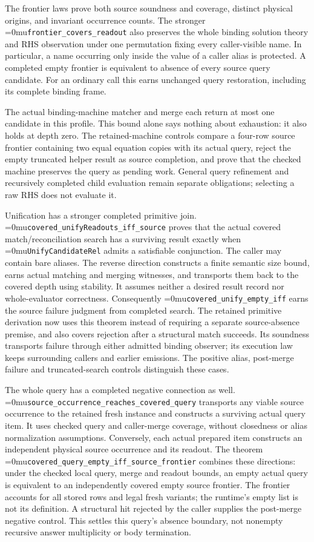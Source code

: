 \documentclass[11pt,a4paper]{article}
\newcommand{\name}[1]{\textup{\Urlmuskip=0mu\relax\nolinkurl{#1}}}
\begin{document}
The frontier laws prove both source soundness and coverage, distinct
physical origins, and invariant occurrence counts. The stronger
\name{frontier_covers_readout} also preserves the whole binding solution
theory and RHS observation under one permutation fixing every caller-visible
name. In particular, a name occurring only inside the value of a caller
alias is protected. A completed empty frontier is equivalent to absence of
every source query candidate. For an ordinary call this earns unchanged
query restoration, including its complete binding frame.

The actual binding-machine matcher and merge each return at most one
candidate in this profile. This bound alone says nothing about exhaustion:
it also holds at depth zero. The retained-machine controls compare a
four-row source frontier containing two equal equation copies with its
actual query, reject the empty truncated helper result as source completion,
and prove that the checked machine preserves the query as pending work.
General query refinement and recursively completed child evaluation remain
separate obligations; selecting a raw RHS does not evaluate it.

Unification has a stronger completed primitive join.
\name{covered_unifyReadouts_iff_source} proves that the actual covered
match/reconciliation search has a surviving result exactly when
\name{UnifyCandidateRel} admits a satisfiable conjunction. The caller may
contain bare aliases. The reverse direction constructs a finite semantic
size bound, earns actual matching and merging witnesses, and transports
them back to the covered depth using stability. It assumes neither a desired
result record nor whole-evaluator correctness.
Consequently \name{covered_unify_empty_iff} earns the source failure
judgment from completed search. The retained primitive derivation now uses
this theorem instead of requiring a separate source-absence premise, and
also covers rejection after a structural match succeeds. Its soundness
transports failure through either admitted binding observer; its execution
law keeps surrounding callers and earlier emissions. The positive alias,
post-merge failure and truncated-search controls distinguish these cases.

The whole query has a completed negative connection as well.
\name{source_occurrence_reaches_covered_query} transports any viable source
occurrence to the retained fresh instance and constructs a surviving actual
query item. It uses checked query and caller-merge coverage, without closedness
or alias normalization assumptions. Conversely, each actual prepared item
constructs an independent physical source occurrence and its readout.
The theorem \name{covered_query_empty_iff_source_frontier} combines these
directions: under the checked local query, merge and readout bounds, an empty
actual query is equivalent to an independently covered empty source frontier.
The frontier accounts for all stored rows and legal fresh variants; the
runtime's empty list is not its definition. A structural hit rejected by the
caller supplies the post-merge negative control. This settles this query's
absence boundary, not nonempty recursive answer multiplicity or body
termination.
\end{document}
